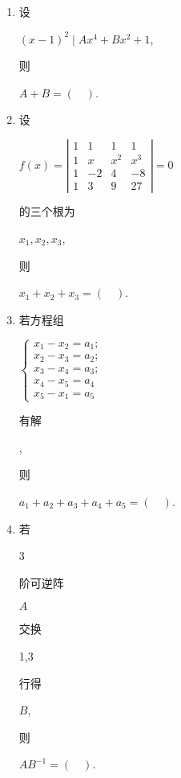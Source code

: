 \documentclass[10pt]{article}
\begin{document}
\begin{enumerate}
  \item \begin{CJK}{UTF8}{mj}设\end{CJK} $(x-1)^{2} \mid A x^{4}+B x^{2}+1$, \begin{CJK}{UTF8}{mj}则\end{CJK} $A+B=(\quad)$.

  \item \begin{CJK}{UTF8}{mj}设\end{CJK} $f(x)=\left|\begin{array}{cccc}1 & 1 & 1 & 1 \\ 1 & x & x^{2} & x^{3} \\ 1 & -2 & 4 & -8 \\ 1 & 3 & 9 & 27\end{array}\right|=0$ \begin{CJK}{UTF8}{mj}的三个根为\end{CJK} $x_{1}, x_{2}, x_{3}$, \begin{CJK}{UTF8}{mj}则\end{CJK} $x_{1}+x_{2}+x_{3}=(\quad)$.

  \item \begin{CJK}{UTF8}{mj}若方程组\end{CJK} $\left\{\begin{array}{l}x_{1}-x_{2}=a_{1} ; \\ x_{2}-x_{3}=a_{2} ; \\ x_{3}-x_{4}=a_{3} ; \\ x_{4}-x_{5}=a_{4} \\ x_{5}-x_{1}=a_{5}\end{array}\right.$ \begin{CJK}{UTF8}{mj}有解\end{CJK}, \begin{CJK}{UTF8}{mj}则\end{CJK} $a_{1}+a_{2}+a_{3}+a_{4}+a_{5}=(\quad)$.

  \item \begin{CJK}{UTF8}{mj}若\end{CJK} 3 \begin{CJK}{UTF8}{mj}阶可逆阵\end{CJK} $A$ \begin{CJK}{UTF8}{mj}交换\end{CJK} 1,3 \begin{CJK}{UTF8}{mj}行得\end{CJK} $B$, \begin{CJK}{UTF8}{mj}则\end{CJK} $A B^{-1}=(\quad)$.


\end{enumerate}
\end{document}
